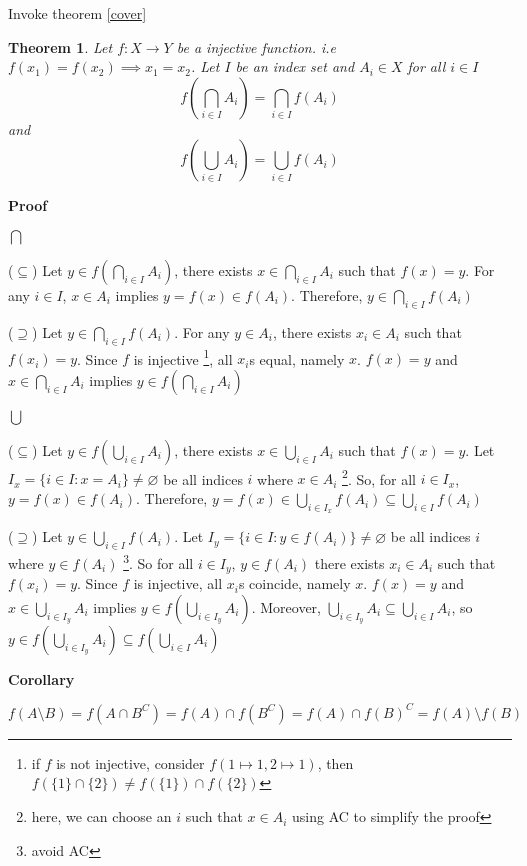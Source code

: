 \documentclass{article}
\newtheorem{theorem}{Theorem}
\let\emptyset\varnothing
\begin{document}
Invoke theorem \ref{cover}

\begin{theorem}
    Let $f: X \to Y$ be a injective function. i.e $f(x_1) = f(x_2) \implies x_1 = x_2$. 
    Let $I$ be an index set and $A_i \in X$ for all $i \in I$
    $$
        f(\bigcap_{i \in I} A_i) = \bigcap_{i \in I} f(A_i)
    $$
    and
    $$
        f(\bigcup_{i \in I} A_i) = \bigcup_{i \in I} f(A_i)
    $$
\end{theorem}

\textbf{Proof}

$\bigcap$

($\subseteq$) Let $y \in f(\bigcap_{i \in I} A_i)$, there exists $x \in \bigcap_{i \in I} A_i$ such that $f(x) = y$. For any $i \in I$, $x \in A_i$ implies $y = f(x) \in f(A_i)$. Therefore, $y \in \bigcap_{i \in I} f(A_i)$

($\supseteq$) Let $y \in \bigcap_{i \in I} f(A_i)$. For any $y \in A_i$, there exists $x_i \in A_i$ such that $f(x_i) = y$. Since $f$ is injective \footnote{if $f$ is not injective, consider $f(1 \mapsto 1, 2 \mapsto 1)$, then $f(\{1\} \cap \{2\}) \neq f(\{1\}) \cap f(\{2\})$}, all $x_i$s equal, namely $x$. $f(x) = y$ and $x \in \bigcap_{i \in I} A_i$ implies $y \in f(\bigcap_{i \in I} A_i)$


$\bigcup$

($\subseteq$) Let $y \in f(\bigcup_{i \in I} A_i)$, there exists $x \in \bigcup_{i \in I} A_i$ such that $f(x) = y$. Let $I_x = \{i \in I: x = A_i\} \neq \emptyset$ be all indices $i$ where $x \in A_i$ \footnote{here, we can choose an $i$ such that $x \in A_i$ using AC to simplify the proof}. So, for all $i \in I_x$, $y = f(x) \in f(A_i)$. Therefore, $y = f(x) \in \bigcup_{i \in I_x} f(A_i) \subseteq \bigcup_{i \in I} f(A_i)$

($\supseteq$) Let $y \in \bigcup_{i \in I} f(A_i)$. Let $I_y = \{i \in I: y \in f(A_i) \} \neq \emptyset$ be all indices $i$ where $y \in f(A_i)$ \footnote{avoid AC}. So for all $i \in I_y$, $y \in f(A_i)$ there exists $x_i \in A_i$ such that $f(x_i) = y$. Since $f$ is injective, all $x_i$s coincide, namely $x$. $f(x) = y$ and $x \in \bigcup_{i \in I_y} A_i$ implies $y \in f(\bigcup_{i \in I_y} A_i)$. Moreover, $\bigcup_{i \in I_y} A_i \subseteq \bigcup_{i \in I} A_i$, so $y \in f(\bigcup_{i \in I_y} A_i) \subseteq f(\bigcup_{i \in I} A_i)$

\textbf{Corollary}

$f(A \setminus B) = f(A \cap B^C) = f(A) \cap f(B^C) = f(A) \cap f(B)^C = f(A) \setminus f(B)$
\end{document}
